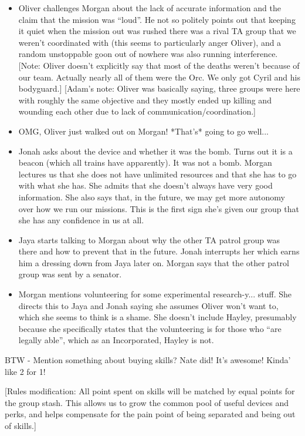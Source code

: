 \begin{itemize}
\item Oliver challenges Morgan about the lack of accurate information and the claim that the mission was ``loud''.  He not so politely points out that keeping it quiet when the mission out was rushed there was a rival TA group that we weren't coordinated with (this seems to particularly anger Oliver), and a random unstoppable goon out of nowhere was also running interference.  {[}Note: Oliver doesn't explicitly say that most of the deaths weren't because of our team.  Actually nearly all of them were the Orc.  We only got Cyril and his bodyguard.{]}  {[}Adam's note: Oliver was basically saying, three groups were here with roughly the same objective and they mostly ended up killing and wounding each other due to lack of communication/coordination.{]}
\item OMG, Oliver just walked out on Morgan! *That's* going to go well...  
\item Jonah asks about the device and whether it was the bomb.  Turns out it is a beacon (which all trains have apparently).  It was not a bomb.  Morgan lectures us that she does not have unlimited resources and that she has to go with what she has.  She admits that she doesn't always have very good information.  She also says that, in the future, we may get more autonomy over how we run our missions.  This is the first sign she's given our group that she has any confidence in us at all.
\item Jaya starts talking to Morgan about why the other TA patrol group was there and how to prevent that in the future.  Jonah interrupts her which earns him a dressing down from Jaya later on.  Morgan says that the other patrol group was sent by a senator.
\item Morgan mentions volunteering for some experimental research-y... stuff.  She directs this to Jaya and Jonah saying she assumes Oliver won't want to, which she seems to think is a shame.  She doesn't include Hayley, presumably because she specifically states that the volunteering is for those who ``are legally able'', which as an Incorporated, Hayley is not.
\end{itemize}



BTW - Mention something about buying skills?   Nate did! It's awesome! Kinda' like 2 for 1!



{[}Rules modification: All point spent on skills will be matched by equal points for the group stash.  This allows us to grow the common pool of useful devices and perks, and helps compensate for the pain point of being separated and being out of skills.{]}



